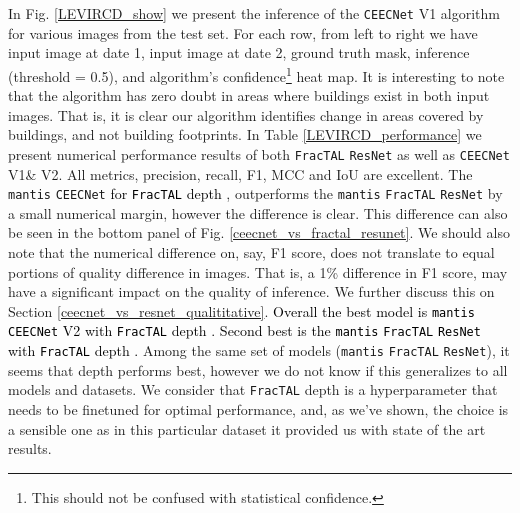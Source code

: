 \documentclass[times, 5p]{elsarticle}
\def \FracTAL {\texttt{FracTAL} }
\newcommand{\ceecnet}{\texttt{CEECNet}}
\newcommand{\mantis}{\texttt{mantis}}
\begin{document}
In Fig. \ref{LEVIRCD_show} we present the inference of the \ceecnet{} V1 algorithm for various images from the test set. For each row, from left to right we have input image at date 1, input image at date 2, ground truth mask, inference (threshold = 0.5), and algorithm's confidence\footnote{This should not be confused with statistical confidence.} heat map. It is interesting to note that the algorithm has zero doubt in areas where buildings exist in both input images. That is, it is clear our algorithm identifies change in areas covered by buildings, and not building footprints.  In Table \ref{LEVIRCD_performance} we present numerical performance results of both \FracTAL \texttt{ResNet} as well as \ceecnet{} V1\& V2. All metrics, precision, recall, F1, MCC and IoU are excellent. The \mantis{} \ceecnet{} \textcolor{black}{for \FracTAL depth }, outperforms the \mantis{} \FracTAL{} \texttt{ResNet} by a small numerical margin, however the difference is clear. This difference can also be seen in the bottom panel of Fig. \ref{ceecnet_vs_fractal_resunet}. We should also note that the numerical difference on, say, F1 score, does not translate to equal portions of quality difference in images. That is, a 1\% difference in F1 score, may have a significant impact on the quality of inference. 
We further discuss  this on Section \ref{ceecnet_vs_resnet_qualititative}. 
\textcolor{black}{Overall the best model is \mantis{} \ceecnet{} V2 with \FracTAL depth . Second best is the \mantis{} \FracTAL \texttt{ResNet} with \FracTAL depth .} Among the same set of models (\mantis{} \FracTAL {}\texttt{ResNet}), it seems that depth  performs best, however we do not know if this generalizes to all models and datasets. We consider that \FracTAL depth  is a hyperparameter that needs to be finetuned for optimal performance, and, as we've shown, the choice  is a sensible one as in this particular dataset it provided us with state of the art results.  
\end{document}
